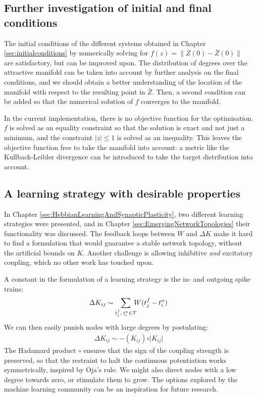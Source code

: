 \subsection{Further investigation of initial and final conditions}
The initial conditions of the different systems obtained in Chapter \ref{sec:initialconditions} by numerically solving for $f(z) = \| Z(0) - \bar{Z}(0) \|$ are satisfactory, but can be improved upon. The distribution of degrees over the attractive manifold can be taken into account by further analysis on the final conditions, and we should obtain a better understanding of the location of the manifold with respect to the resulting point in $\bar{Z}$. Then, a second condition can be added so that the numerical solution of $f$ converges to the manifold. 

In the current implementation, there is no objective function for the optimisation. $f$ is solved as an equality constraint so that the solution is exact and not just a minimum, and the constraint $| z | \leq 1$ is solved as an inequality. This leaves the objective function free to take the manifold into account: a metric like the Kullback-Leibler divergence can be introduced to take the target distribution into account. 


\subsection{A learning strategy with desirable properties}
In Chapter \ref{sec:HebbianLearningAndSynapticPlasticity}, two different learning strategies were presented, and in Chapter \ref{sec:EmergingNetworkTopologies} their functionality was discussed. The feedback loops between $W$ and $\Delta K$ make it hard to find a formulation that would guarantee a stable network topology, without the artificial bounds on $K$. Another challenge is allowing inhibitive \textsl{and} excitatory coupling, which no other work has touched upon.

A constant in the formulation of a learning strategy is the in- and outgoing spike trains: 
\begin{align}
\Delta K_{ij} \sim \sum_{t_{j}^{f}, \: t_i^{n} \in \mathcal{T}} \hspace{-2mm} W (t_{j}^{f}-t_i^{n} )
\end{align}
We can then easily punish nodes with large degrees by postulating:
\begin{align}
\Delta K_{ij} \sim - (K_{ij}) \circ \rvert K_{ij} \rvert
\end{align}
The Hadamard product $\circ$ ensures that the sign of the coupling strength is preserved, so that the restraint to halt the continuous potentiation works symmetrically, inspired by Oja's rule\cite{ChrolCannon2014}. We might also direct nodes with a low degree towards zero, or stimulate them to grow. The options explored by the machine learning community can be an inspiration for future research.


